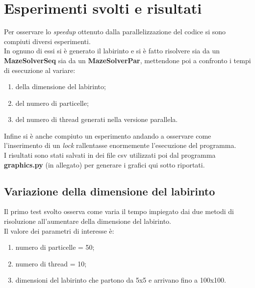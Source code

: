 \documentclass[10pt,twocolumn,letterpaper]{article}
\begin{document}
\section{Esperimenti svolti e risultati}
Per osservare lo \textit{speedup} ottenuto dalla parallelizzazione del codice si sono compiuti diversi esperimenti.\\
In ognuno di essi si è generato il labirinto e si è fatto risolvere sia da un \textbf{MazeSolverSeq} sia da un \textbf{MazeSolverPar}, mettendone poi a confronto i tempi di esecuzione al variare:
\begin{enumerate}
\item{della dimensione del labirinto;}
\item{del numero di particelle;}
\item{del numero di thread generati nella versione parallela.}
\end{enumerate}
Infine si è anche compiuto un esperimento andando a osservare come l'inserimento di un \textit{lock} rallentasse enormemente l'esecuzione del programma.\\
I risultati sono stati salvati in dei file csv utilizzati poi dal programma \textbf{graphics.py} (in allegato) per generare i grafici qui sotto riportati.

\subsection{Variazione della dimensione del labirinto}

Il primo test svolto osserva come varia il tempo impiegato dai due metodi di risoluzione all'aumentare della dimensione del labirinto.\\
Il valore dei parametri di interesse è:
\begin{enumerate}[-]
\item{numero di particelle = 50;}
\item{numero di thread = 10;}
\item{dimensioni del labirinto che partono da 5x5 e arrivano fino a 100x100.}
\end{enumerate}
\end{document}
